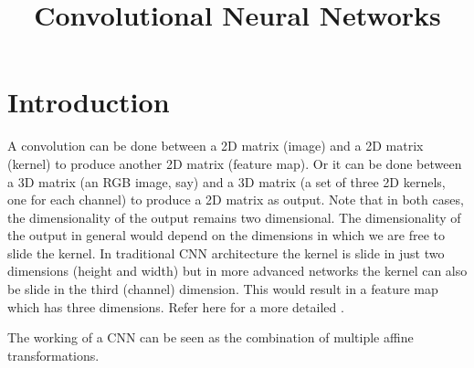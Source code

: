 \documentclass{../template/texnote}
\title{Convolutional Neural Networks}
\begin{document}
    \maketitle {}
	\section{Introduction}
	A convolution can be done between a 2D matrix (image) and a 2D matrix (kernel) to produce another 2D matrix (feature map).
	Or it can be done between a 3D matrix (an RGB image, say) and a 3D matrix (a set of three 2D kernels, one for each channel) to produce a 2D matrix as output.
	Note that in both cases, the dimensionality of the output remains two dimensional.
	The dimensionality of the output in general would depend on the dimensions in which we are free to slide the kernel.
	In traditional CNN architecture the kernel is slide in just two dimensions (height and width) but in more advanced networks the kernel can also be slide in the third (channel) dimension.
	This would result in a feature map which has three dimensions.
	Refer here for a more detailed .

	The working of a CNN can be seen as the combination of multiple affine transformations.
    \printbibliography
\end{document}

